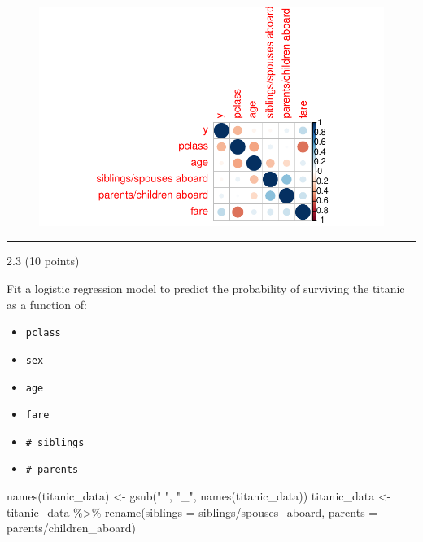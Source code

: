 \documentclass[
  letterpaper,
  DIV=11,
  numbers=noendperiod]{scrartcl}
\newenvironment{Shaded}{\begin{snugshade}}{\end{snugshade}}
\newcommand{\AttributeTok}[1]{\textcolor[rgb]{0.40,0.45,0.13}{#1}}
\newcommand{\FunctionTok}[1]{\textcolor[rgb]{0.28,0.35,0.67}{#1}}
\newcommand{\NormalTok}[1]{\textcolor[rgb]{0.00,0.23,0.31}{#1}}
\newcommand{\OtherTok}[1]{\textcolor[rgb]{0.00,0.23,0.31}{#1}}
\newcommand{\SpecialCharTok}[1]{\textcolor[rgb]{0.37,0.37,0.37}{#1}}
\newcommand{\StringTok}[1]{\textcolor[rgb]{0.13,0.47,0.30}{#1}}
\providecommand{\tightlist}{%
  \setlength{\itemsep}{0pt}\setlength{\parskip}{0pt}}\usepackage{longtable,booktabs,array}
\begin{document}
\begin{figure}[H]

{\centering \includegraphics{hm4_files/figure-pdf/unnamed-chunk-11-1.pdf}

}

\end{figure}

\begin{center}\rule{0.5\linewidth}{0.5pt}\end{center}

2.3 (10 points)

Fit a logistic regression model to predict the probability of surviving
the titanic as a function of:

\begin{itemize}
\tightlist
\item
  \texttt{pclass}
\item
  \texttt{sex}
\item
  \texttt{age}
\item
  \texttt{fare}
\item
  \texttt{\#\ siblings}
\item
  \texttt{\#\ parents}
\end{itemize}

\begin{Shaded}
\begin{Highlighting}[]
\FunctionTok{names}\NormalTok{(titanic\_data) }\OtherTok{\textless{}{-}} \FunctionTok{gsub}\NormalTok{(}\StringTok{" "}\NormalTok{, }\StringTok{"\_"}\NormalTok{, }\FunctionTok{names}\NormalTok{(titanic\_data))}
\NormalTok{titanic\_data }\OtherTok{\textless{}{-}}\NormalTok{ titanic\_data }\SpecialCharTok{\%\textgreater{}\%}
  \FunctionTok{rename}\NormalTok{(}\AttributeTok{siblings =} \StringTok{\textasciigrave{}}\AttributeTok{siblings/spouses\_aboard}\StringTok{\textasciigrave{}}\NormalTok{, }\AttributeTok{parents =} \StringTok{\textasciigrave{}}\AttributeTok{parents/children\_aboard}\StringTok{\textasciigrave{}}\NormalTok{)}
\end{Highlighting}
\end{Shaded}
\end{document}
